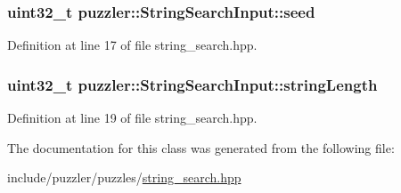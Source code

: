\hypertarget{a00032_a1b0f189a01feb433ed423e651909c74c}{}
\subsubsection[{seed}]{\setlength{\rightskip}{0pt plus 5cm}uint32\+\_\+t puzzler\+::\+String\+Search\+Input\+::seed}\label{a00032_a1b0f189a01feb433ed423e651909c74c}


Definition at line 17 of file string\+\_\+search.\+hpp.

\hypertarget{a00032_a2bfd9b352187289998bc50e9511cc227}{}
\subsubsection[{string\+Length}]{\setlength{\rightskip}{0pt plus 5cm}uint32\+\_\+t puzzler\+::\+String\+Search\+Input\+::string\+Length}\label{a00032_a2bfd9b352187289998bc50e9511cc227}


Definition at line 19 of file string\+\_\+search.\+hpp.



The documentation for this class was generated from the following file\+:\begin{DoxyCompactItemize}
\item 
include/puzzler/puzzles/\hyperlink{a00133}{string\+\_\+search.\+hpp}\end{DoxyCompactItemize}
